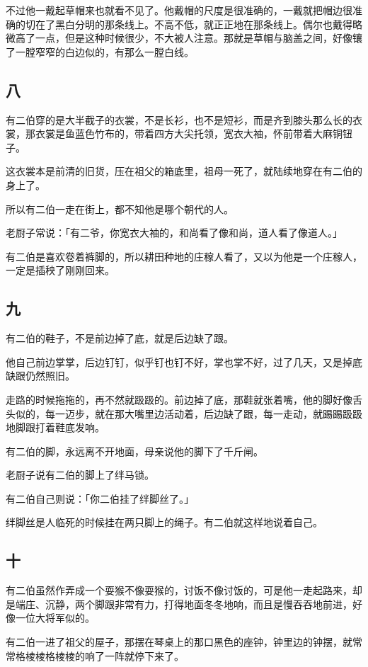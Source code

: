 \documentclass[UTF8]{ctexart}
\begin{document}
不过他一戴起草帽来也就看不见了。他戴帽的尺度是很准确的，一戴就把帽边很准确的切在了黑白分明的那条线上。不高不低，就正正地在那条线上。偶尔也戴得略微高了一点，但是这种时候很少，不大被人注意。那就是草帽与脑盖之间，好像镶了一膛窄窄的白边似的，有那么一膛白线。

\subsection{八}

有二伯穿的是大半截子的衣裳，不是长衫，也不是短衫，而是齐到膝头那么长的衣裳，那衣裳是鱼蓝色竹布的，带着四方大尖托领，宽衣大袖，怀前带着大麻铜钮子。

这衣裳本是前清的旧货，压在祖父的箱底里，祖母一死了，就陆续地穿在有二伯的身上了。

所以有二伯一走在街上，都不知他是哪个朝代的人。

老厨子常说：「有二爷，你宽衣大袖的，和尚看了像和尚，道人看了像道人。」

有二伯是喜欢卷着裤脚的，所以耕田种地的庄稼人看了，又以为他是一个庄稼人，一定是插秧了刚刚回来。

\subsection{九}

有二伯的鞋子，不是前边掉了底，就是后边缺了跟。

他自己前边掌掌，后边钉钉，似乎钉也钉不好，掌也掌不好，过了几天，又是掉底缺跟仍然照旧。

走路的时候拖拖的，再不然就趿趿的。前边掉了底，那鞋就张着嘴，他的脚好像舌头似的，每一迈步，就在那大嘴里边活动着，后边缺了跟，每一走动，就踢踢趿趿地脚跟打着鞋底发响。

有二伯的脚，永远离不开地面，母亲说他的脚下了千斤闸。

老厨子说有二伯的脚上了绊马锁。

有二伯自己则说：「你二伯挂了绊脚丝了。」

绊脚丝是人临死的时候挂在两只脚上的绳子。有二伯就这样地说着自己。

\subsection{十}

有二伯虽然作弄成一个{耍猴不像耍猴的，讨饭不像讨饭的}，可是他一走起路来，却是端庄、沉静，两个脚跟非常有力，打得地面冬冬地响，而且是慢吞吞地前进，好像一位大将军似的。

有二伯一进了祖父的屋子，那摆在琴桌上的那口黑色的座钟，钟里边的钟摆，就常常格棱棱格棱棱的响了一阵就停下来了。
\end{document}
